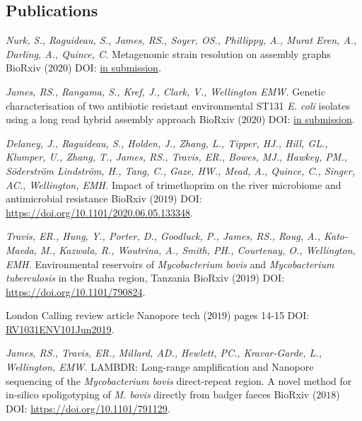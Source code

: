 \documentclass[hidelinks]{james-cv} %
\begin{document}
\subsection{Publications}
\hspace{-25\parskip}\begin{reflist}
\ent
\textit{Nurk, S., Raguideau, S., James, RS., Soyer, OS., Phillippy, A., Murat Eren, A., Darling, A., Quince, C. } {Metagenomic strain resolution on assembly graphs} {BioRxiv \color{gray}($2020$) \bodyfontsc DOI: \thinfont\color{blue}\href{https://www.biorxiv.org/}{in submission}.}

\ent
\textit{James, RS., Rangama, S., Kref, J., Clark, V., Wellington EMW. } {Genetic characterisation of two antibiotic resistant environmental ST131 \textit {E. coli} \textrm isolates using a long read hybrid assembly approach } {BioRxiv \color{gray}($2020$) \bodyfontsc DOI: \thinfont\color{blue}\href{https://www.biorxiv.org/}{in submission}.}

\ent
\textit{Delaney, J., Raguideau, S., Holden, J., Zhang, L., Tipper, HJ., Hill, GL., Klumper, U., Zhang, T., James, RS., Travis, ER., Bowes, MJ., Hawkey, PM., Söderström Lindström, H., Tang, C., Gaze, HW., Mead, A., Quince, C., Singer, AC., Wellington, EMH. } {Impact of trimethoprim on the river microbiome and antimicrobial resistance } {BioRxiv \color{gray}($2019$) \bodyfontsc DOI: \thinfont\color{blue}\href{https://www.biorxiv.org/content/10.1101/2020.06.05.133348v1}{https://doi.org/10.1101/2020.06.05.133348}.}

\ent
\textit{Travis, ER., Hung, Y., Porter, D., Goodluck, P., James, RS., Roug, A., Kato-Maeda, M., Kazwala, R., Woutrina, A., Smith, PH., Courtenay, O., Wellington, EMH. } {Environmental reservoirs of \textit {Mycobacterium bovis} \textrm and \textit {Mycobacterium tuberculosis} \textrm in the Ruaha region, Tanzania } {BioRxiv \color{gray}($2019$) \bodyfontsc DOI: \thinfont\color{blue}\href{https://www.biorxiv.org/content/10.1101/791129v2}{https://doi.org/10.1101/790824}.}

\ent
{}
{London Calling review article } {Nanopore tech \color{gray}($2019$) pages 14-15 \bodyfontsc DOI: \thinfont\color{blue}\href{https://nanoporetech.com/resource-centre/london-calling-review}{RV1031ENV101Jun2019}.}

\ent
\textit{James, RS., Travis, ER., Millard, AD., Hewlett, PC., Kravar-Garde, L., Wellington, EMW. } {LAMBDR: Long-range amplification and Nanopore sequencing of the \textit{Mycobacterium bovis} \textrm direct-repeat region. A novel method for in-silico spoligotyping of \textit {M. bovis} \textrm directly from badger faeces } {BioRxiv \color{gray}($2018$) \bodyfontsc DOI: \thinfont\color{blue}\href{https://www.biorxiv.org/content/10.1101/790824v1}{https://doi.org/10.1101/791129}.}


\end{reflist}
\end{document}
